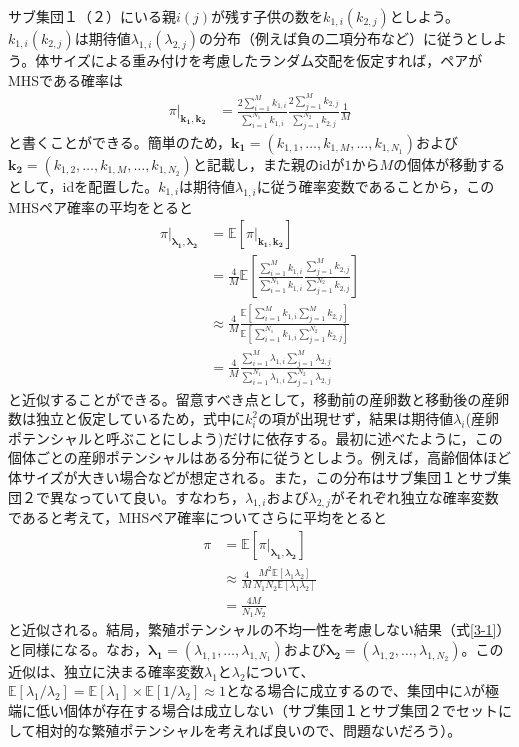 \documentclass[12pt, English]{article}
\begin{document}
\begin{spacing}{1.9}
サブ集団１（２）にいる親$i(j)$が残す子供の数を$k_{1,i}(k_{2,j})$としよう。$k_{1,i}(k_{2,j})$は期待値$\lambda_{1,i}(\lambda_{2,j})$の分布（例えば負の二項分布など）に従うとしよう。体サイズによる重み付けを考慮したランダム交配を仮定すれば，ペアがMHSである確率は
\begin{align}
\pi | _{\boldsymbol{k_1, k_2}} &= \frac{ 2\sum_{i=1}^M k_{1,i} } { \sum_{i=1}^{N_1} k_{1,i} } \frac{ 2\sum_{j=1}^M k_{2,j} } { \sum_{j=1}^{N_2} k_{2,j} } \frac{1}{M} 
\end{align}
と書くことができる。簡単のため，$\boldsymbol{k_1}=(k_{1,1}, \ldots, k_{1,M}, \ldots, k_{1,N_1})$および$\boldsymbol{k_2}=(k_{1,2}, \ldots, k_{1,M}, \ldots, k_{1,N_2})$と記載し，また親のidが$1$から$M$の個体が移動するとして，idを配置した。$k_{1,i}$は期待値$\lambda_{1,i}$に従う確率変数であることから，このMHSペア確率の平均をとると
\begin{align}
\pi | _{\boldsymbol{\lambda_1, \lambda_2}} &= \mathbb{E}[\pi | _{\boldsymbol{k_1, k_2}}] \nonumber\\
&= \frac{4}{M} \mathbb{E}\left[\frac{ \sum_{i=1}^M k_{1,i} } { \sum_{i=1}^{N_1} k_{1,i} } \frac{ \sum_{j=1}^M k_{2,j} } { \sum_{j=1}^{N_2} k_{2,j} } \right]   \nonumber\\
&\approx \frac{4}{M} \frac{ \mathbb{E}\left[ \sum_{i=1}^M k_{1,i} \sum_{j=1}^M k_{2,j} \right] } {\mathbb{E}\left[ \sum_{i=1}^{N_1} k_{1,i} \sum_{j=1}^{N_2} k_{2,j}\right]} \nonumber\\
&= \frac{4}{M} \frac{ \sum_{i=1}^M \lambda_{1,i} \sum_{j=1}^M \lambda_{2,j} } {\sum_{i=1}^{N_1} \lambda_{1,i} \sum_{j=1}^{N_2} \lambda_{2,j}} 
\end{align}
と近似することができる。留意すべき点として，移動前の産卵数と移動後の産卵数は独立と仮定しているため，式中に$k_i^2$の項が出現せず，結果は期待値$\lambda_i$(産卵ポテンシャルと呼ぶことにしよう)だけに依存する。最初に述べたように，この個体ごとの産卵ポテンシャルはある分布に従うとしよう。例えば，高齢個体ほど体サイズが大きい場合などが想定される。また，この分布はサブ集団１とサブ集団２で異なっていて良い。すなわち，$\lambda_{1,i}$および$\lambda_{2,j}$がそれぞれ独立な確率変数であると考えて，MHSペア確率についてさらに平均をとると
\begin{align}
\pi &= \mathbb{E}[\pi | _{\boldsymbol{\lambda_1, \lambda_2}}] \nonumber\\ 
&\approx \frac{4}{M} \frac{M^2 \mathbb{E}[\lambda_1 \lambda_2]}{N_1 N_2 \mathbb{E}[\lambda_1 \lambda_2]}\nonumber\\
&= \frac{4M}{N_{1}N_{2}}
\label{4-1}
\end{align}
と近似される。結局，繁殖ポテンシャルの不均一性を考慮しない結果（式\ref{3-1}）と同様になる。なお，$\boldsymbol{\lambda_1}=(\lambda_{1,1}, \ldots, \lambda_{1,N_1})$および$\boldsymbol{\lambda_2}=(\lambda_{1,2}, \ldots, \lambda_{1,N_2})$。この近似は、独立に決まる確率変数$\lambda_1$と$\lambda_2$について、$\mathbb{E}[\lambda_1/\lambda_2]=\mathbb{E}[\lambda_1] \times \mathbb{E}[1/\lambda_2] \approx 1$となる場合に成立するので、集団中に$\lambda$が極端に低い個体が存在する場合は成立しない（サブ集団１とサブ集団２でセットにして相対的な繁殖ポテンシャルを考えれば良いので、問題ないだろう）。


\end{spacing}
\end{document}
